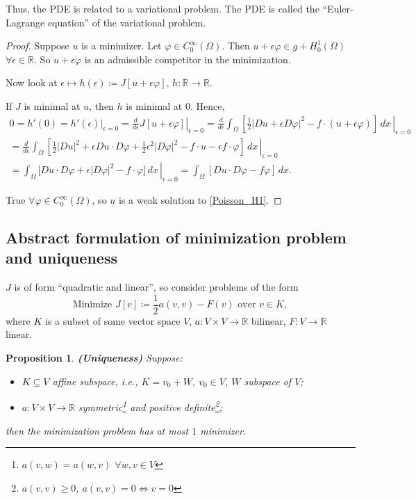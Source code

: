 \documentclass[12pt]{article}
\newtheorem{proposition}{Proposition}[section]
\theoremstyle{definition}
\begin{document}
Thus, the PDE is related to a variational problem. The PDE is called the ``Euler-Lagrange equation'' of the variational problem.

\begin{proof}
Suppose $u$ is a minimizer. Let $\varphi\in C_0^{\infty}(\Omega)$. Then $u+\epsilon\varphi\in g+H_0^1(\Omega)$ $\forall\epsilon\in\mathbb{R}$. So $u+\epsilon\varphi$ is an admissible competitor in the minimization.

Now look at $\epsilon\mapsto h(\epsilon)\coloneqq J[u+\epsilon\varphi]$, $h:\mathbb{R}\rightarrow\mathbb{R}$.

If $J$ is minimal at $u$, then $h$ is minimal at $0$. Hence,
\begin{multline*}
0=h'(0)=h'(\epsilon)|_{\epsilon=0}=\left.\frac{d}{d\epsilon}J[u+\epsilon\varphi]\right|_{\epsilon=0}=\left.\frac{d}{d\epsilon}\int_{\Omega}\left[\frac{1}{2}|Du+\epsilon D\varphi|^2-f\cdot(u+\epsilon\varphi)\right]\,dx\,\right|_{\epsilon=0}\\
=\left.\frac{d}{d\epsilon}\int_{\Omega}\left[\frac{1}{2}|Du|^2+\epsilon Du\cdot D\varphi+\frac{1}{2}\epsilon^2|D\varphi|^2-f\cdot u-\epsilon f\cdot\varphi\right]\,dx\,\right|_{\epsilon=0}\\
=\left.\int_{\Omega}\big[Du\cdot D\varphi+\epsilon|D\varphi|^2-f\cdot\varphi\big]\,dx\,\right|_{\epsilon=0}=\int_{\Omega}[Du\cdot D\varphi-f\varphi]\,dx.
\end{multline*}

True $\forall\varphi\in C_0^{\infty}(\Omega)$, so $u$ is a weak solution to \eqref{Poisson_H1}.
\end{proof}

\subsection{Abstract formulation of minimization problem and uniqueness}
$J$ is of form ``quadratic and linear'', so consider problems of the form
\[\text{Minimize }J[v]\coloneqq\frac{1}{2}a(v,v)-F(v)\text{ over }v\in K,\]
where $K$ is a subset of some vector space $V$, $a:V\times V\rightarrow\mathbb{R}$ bilinear, $F:V\rightarrow\mathbb{R}$ linear.

\begin{proposition}\label{uniqueness_minimizer}
\emph{\textbf{(Uniqueness)}} Suppose:
\begin{itemize}
\item $K\subseteq V$ affine subspace, i.e., $K=v_0+W$, $v_0\in V$, $W$ subspace of $V$;
\item $a:V\times V\rightarrow\mathbb{R}$ symmetric\footnote{$a(v,w)=a(w,v)$ $\forall w,v\in V$} and positive definite\footnote{$a(v,v)\geq0$, $a(v,v)=0\Leftrightarrow v=0$};
\end{itemize}
then the minimization problem has at most $1$ minimizer.
\end{proposition}
\end{document}
